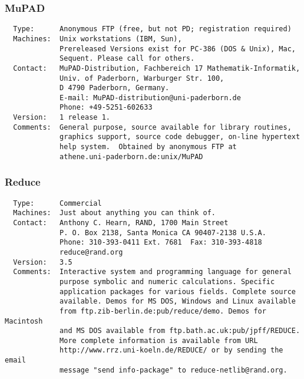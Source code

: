 \subsubsection{MuPAD}
\begin{verbatim}
  Type:      Anonymous FTP (free, but not PD; registration required)
  Machines:  Unix workstations (IBM, Sun),
             Prereleased Versions exist for PC-386 (DOS & Unix), Mac,
             Sequent. Please call for others.
  Contact:   MuPAD-Distribution, Fachbereich 17 Mathematik-Informatik,
             Univ. of Paderborn, Warburger Str. 100,
             D 4790 Paderborn, Germany.
             E-mail: MuPAD-distribution@uni-paderborn.de
             Phone: +49-5251-602633
  Version:   1 release 1.
  Comments:  General purpose, source available for library routines,
             graphics support, source code debugger, on-line hypertext
             help system.  Obtained by anonymous FTP at
             athene.uni-paderborn.de:unix/MuPAD
\end{verbatim}

\subsubsection{Reduce}
\begin{verbatim}
  Type:      Commercial
  Machines:  Just about anything you can think of.
  Contact:   Anthony C. Hearn, RAND, 1700 Main Street
             P. O. Box 2138, Santa Monica CA 90407-2138 U.S.A.
             Phone: 310-393-0411 Ext. 7681  Fax: 310-393-4818
             reduce@rand.org
  Version:   3.5
  Comments:  Interactive system and programming language for general
             purpose symbolic and numeric calculations. Specific
             application packages for various fields. Complete source
             available. Demos for MS DOS, Windows and Linux available
             from ftp.zib-berlin.de:pub/reduce/demo. Demos for Macintosh
             and MS DOS available from ftp.bath.ac.uk:pub/jpff/REDUCE.
             More complete information is available from URL
             http://www.rrz.uni-koeln.de/REDUCE/ or by sending the email
             message "send info-package" to reduce-netlib@rand.org.
\end{verbatim}


